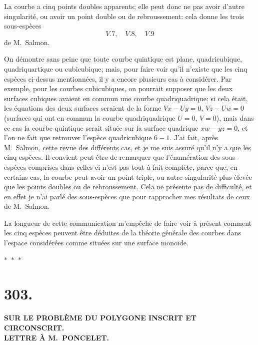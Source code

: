 \documentclass[11pt,a4paper]{article}
\newcommand{\asterism}{\par\begin{center}$\ast$~$\ast$~$\ast$\end{center}\par}
\begin{document}
\clearpage

La courbe a cinq points doubles apparents; elle peut donc ne pas avoir d'autre singularit\'{e}, ou avoir un point double ou de rebroussement: cela donne les trois sous-esp\`{e}ces
\[
V.7, \quad V.8, \quad V.9
\]
de M.~Salmon.

On d\'{e}montre sans peine que toute courbe quintique est plane, quadricubique, quadriquartique ou cubicubique; mais, pour faire voir qu'il n'existe que les cinq esp\`{e}ces ci-dessus mentionn\'{e}es, il y a encore plusieurs cas \`{a} consid\'{e}rer. Par exemple, pour les courbes cubicubiques, on pourrait supposer que les deux surfaces cubiques avaient en commun une courbe quadriquadrique: si cela \'{e}tait, les \'{e}quations des deux surfaces seraient de la forme $Vx - Uy = 0$, $Vz - Uw = 0$ (surfaces qui ont en commun la courbe quadriquadrique $U = 0$, $V = 0$), mais dans ce cas la courbe quintique serait situ\'{e}e sur la surface quadrique $xw - yz = 0$, et l'on ne fait que retrouver l'esp\`{e}ce quadricubique $6 - 1$. J'ai fait, apr\`{e}s M.~Salmon, cette revue des diff\'{e}rents cas, et je me suis assur\'{e} qu'il n'y a que les cinq esp\`{e}ces. Il convient peut-\^{e}tre de remarquer que l'\'{e}num\'{e}ration des sous-esp\`{e}ces comprises dans celles-ci n'est pas tout \`{a} fait compl\`{e}te, parce que, en certains cas, la courbe peut avoir un point triple, ou autre singularit\'{e} plus \'{e}lev\'{e}e que les points doubles ou de rebroussement. Cela ne pr\'{e}sente pas de difficult\'{e}, et en effet je n'ai parl\'{e} des sous-esp\`{e}ces que pour rapprocher mes r\'{e}sultats de ceux de M.~Salmon.

La longueur de cette communication m'emp\^{e}che de faire voir \`{a} pr\'{e}sent comment les cinq esp\`{e}ces peuvent \^{e}tre d\'{e}duites de la th\'{e}orie g\'{e}n\'{e}rale des courbes dans l'espace consid\'{e}r\'{e}es comme situ\'{e}es sur une surface mono\"{i}de.

\asterism

\clearpage

\section*{303.}

\begin{center}
\textbf{SUR LE PROBL\`{E}ME DU POLYGONE INSCRIT ET CIRCONSCRIT.}\\[0.5em]
\textbf{LETTRE \`{A} M.~PONCELET.}
\end{center}
\end{document}
